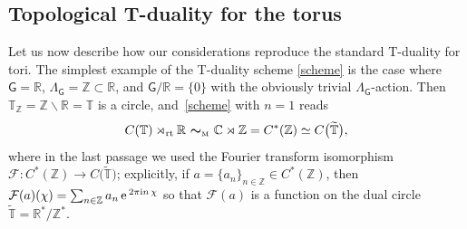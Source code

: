 \documentclass[pdftex]{sigma}
\numberwithin{equation}{section}
\newcommand{\mbf}[1]{{\boldsymbol {#1} }}
\def\ii{{{\rm i}}}
\newcommand{\sfG}{\mathsf{G}}
\newcommand{\rt}{{\rm rt}}
\newcommand{\complex}{{\mathbb C}} %
\newcommand{\zed}{{\mathbb Z}} %
\newcommand{\real}{{\mathbb R}} %
\newcommand{\torus}{{\mathbb T}} %
\def\e{{\,\rm e}\,}
\begin{document}
\subsection{Topological T-duality for the torus}\label{sec:toruscrossedprod}

Let us now describe how our considerations reproduce the standard
T-duality for tori.
The simplest example of the T-duality scheme \eqref{scheme} is the case where $\sfG
=\real$, $\Lambda_\sfG =\zed\subset\real$, and $\sfG/\real=\{0\}$ with the obviously trivial $\Lambda_\sfG$-action. Then
$\torus_\zed= \zed\backslash\real=\torus$ is a circle, and~\eqref{scheme} with $n=1$ reads
\[
C(\torus)\rtimes_\rt \real \ \mbf\sim_{\text{\tiny M}} \ \complex\rtimes \zed
 = C^*(\zed) \simeq C\big(\widetilde\torus\big) ,
\]
where in the last passage we used the Fourier transform isomorphism
${\mathcal F}\colon C^*(\zed)\to C\big(\widetilde\torus\big)$; explicitly,
if $a=\{a_{n}\}_{n\in \zed}\in C^*(\zed)$, then
${\mathcal F}(a)(\chi)=\sum_{n\in \zed} a_{n} \e^{2\pi\ii n\,\chi}$ so that
 ${\mathcal F}(a)$ is a function on the
dual circle $\widetilde\torus=\real^*/\zed^*$.
\end{document}
